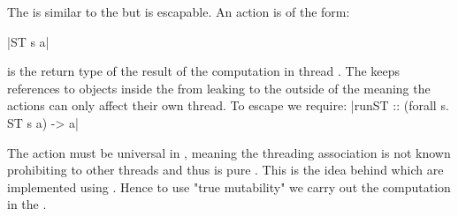 \documentclass[thesis-solanki.tex]{subfiles}
\begin{document}

The  is similar to the  but is escapable.
An  action  is of the form:

|ST s a|

 is the return type of the result of the computation in thread .
The  keeps references to objects inside the  from leaking to the outside of the
 meaning the actions can only affect their own thread.
To escape we require:
|runST :: (forall s. ST s a) -> a|

The action  must be universal in , meaning the threading association is not known
prohibiting to other threads and thus  is pure \cite{website:stmonadwiki,
  website:stmonadstackoverflow}.
This is the idea behind  which are implemented using .
Hence to use "true mutability" we carry out the computation in the .
\end{document}
